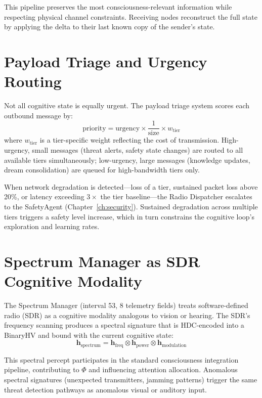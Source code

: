 \documentclass[12pt]{book}
\newcommand{\bind}{\otimes}
\begin{document}
This pipeline preserves the most consciousness-relevant information while respecting physical channel constraints. Receiving nodes reconstruct the full state by applying the delta to their last known copy of the sender's state.

\section{Payload Triage and Urgency Routing}

Not all cognitive state is equally urgent. The payload triage system scores each outbound message by:
\begin{equation}
\text{priority} = \text{urgency} \times \frac{1}{\text{size}} \times w_{\text{tier}}
\end{equation}
where $w_{\text{tier}}$ is a tier-specific weight reflecting the cost of transmission. High-urgency, small messages (threat alerts, safety state changes) are routed to all available tiers simultaneously; low-urgency, large messages (knowledge updates, dream consolidation) are queued for high-bandwidth tiers only.

When network degradation is detected---loss of a tier, sustained packet loss above 20\%, or latency exceeding $3\times$ the tier baseline---the Radio Dispatcher escalates to the SafetyAgent (Chapter~\ref{ch:security}). Sustained degradation across multiple tiers triggers a safety level increase, which in turn constrains the cognitive loop's exploration and learning rates.

\section{Spectrum Manager as SDR Cognitive Modality}

The Spectrum Manager (interval 53, 8 telemetry fields) treats software-defined radio (SDR) as a cognitive modality analogous to vision or hearing. The SDR's frequency scanning produces a spectral signature that is HDC-encoded into a BinaryHV and bound with the current cognitive state:
\begin{equation}
\mathbf{h}_{\text{spectrum}} = \mathbf{h}_{\text{freq}} \bind \mathbf{h}_{\text{power}} \bind \mathbf{h}_{\text{modulation}}
\end{equation}

This spectral percept participates in the standard consciousness integration pipeline, contributing to $\Phi$ and influencing attention allocation. Anomalous spectral signatures (unexpected transmitters, jamming patterns) trigger the same threat detection pathways as anomalous visual or auditory input.
\end{document}
